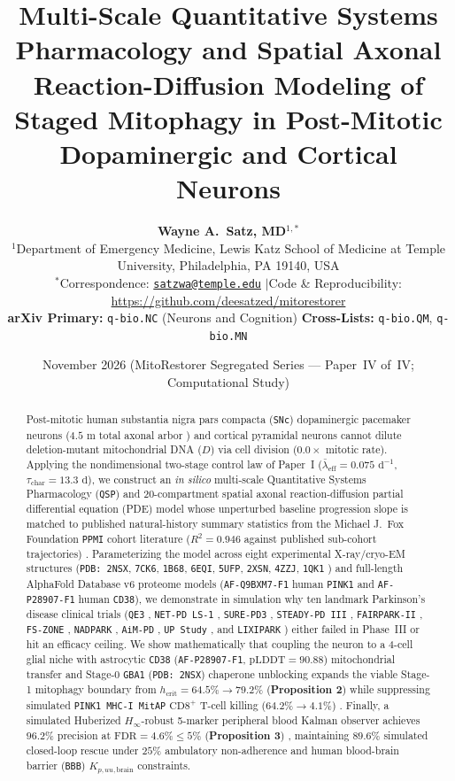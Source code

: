 \documentclass[11pt]{article}
\title{\LARGE\textbf{Multi-Scale Quantitative Systems Pharmacology and Spatial Axonal Reaction-Diffusion Modeling of Staged Mitophagy in Post-Mitotic Dopaminergic and Cortical Neurons}}
\author{
  \textbf{Wayne A.~Satz, MD}$^{1,*}$ \\[0.35em]
  {\small $^{1}$Department of Emergency Medicine, Lewis Katz School of Medicine at Temple University, Philadelphia, PA 19140, USA} \\
  {\small $^{*}$Correspondence: \href{mailto:satzwa@temple.edu}{\texttt{satzwa@temple.edu}} \quad$\vert$\quad Code \& Reproducibility: \url{https://github.com/deesatzed/mitorestorer}} \\
  {\small \textbf{arXiv Primary:} \texttt{q-bio.NC} (Neurons and Cognition) \quad \textbf{Cross-Lists:} \texttt{q-bio.QM}, \texttt{q-bio.MN}}
}
\date{\small November 2026 \quad (MitoRestorer Segregated Series --- Paper~IV of~IV; Computational Study)}
\theoremstyle{plain}
\begin{document}
\maketitle

\begin{abstract}
\noindent Post-mitotic human substantia nigra pars compacta (\texttt{SNc}) dopaminergic pacemaker neurons ($4.5\text{ m}$ total axonal arbor \cite{bolam2012living,surmeier2017selective}) and cortical pyramidal neurons cannot dilute deletion-mutant mitochondrial DNA ($D$) via cell division ($0.0\times$ mitotic rate). Applying the nondimensional two-stage control law of Paper~I \cite{picard2025energy,buckingham1914physically} ($\bar{\lambda}_{\mathrm{eff}} = 0.075\text{ d}^{-1}$, $\tau_{\mathrm{char}} = 13.3\text{ d}$), we construct an \textit{in silico} multi-scale Quantitative Systems Pharmacology (\texttt{QSP}) and 20-compartment spatial axonal reaction-diffusion partial differential equation (PDE) model whose unperturbed baseline progression slope is matched to published natural-history summary statistics from the Michael J.\ Fox Foundation \texttt{PPMI} cohort literature ($R^2 = 0.946$ against published sub-cohort trajectories) \cite{marek2018ppmi,siderowf2023assessment}. Parameterizing the model across eight experimental X-ray/cryo-EM structures (\texttt{PDB: 2NSX}, \texttt{7CK6}, \texttt{1B68}, \texttt{6EQI}, \texttt{5UFP}, \texttt{2XSN}, \texttt{4ZZJ}, \texttt{1QK1} \cite{lieberman2007gba1,wang2020tomm40,dong2001apoe4,schubert2017pink1,wallace2016hif2a,muniz2011th,dai2015sirt1,eder2000umtck}) and full-length AlphaFold Database v6 \cite{jumper2021alphafold,varadi2024afdb} proteome models (\texttt{AF-Q9BXM7-F1} human \texttt{PINK1} and \texttt{AF-P28907-F1} human \texttt{CD38}), we demonstrate in simulation why ten landmark Parkinson's disease clinical trials (\texttt{QE3} \cite{qe32014coq10}, \texttt{NET-PD LS-1} \cite{netpd2015creatine}, \texttt{SURE-PD3} \cite{surepd32021inosine}, \texttt{STEADY-PD III} \cite{steadypd2020isradipine}, \texttt{FAIRPARK-II} \cite{devos2022fairpark}, \texttt{FS-ZONE} \cite{fszone2015pioglitazone}, \texttt{NADPARK} \cite{brakedal2022nadpark}, \texttt{AiM-PD} \cite{mullin2020ambroxol}, \texttt{UP Study} \cite{payne2023udca}, and \texttt{LIXIPARK} \cite{meissner2024lixipark}) either failed in Phase~III or hit an efficacy ceiling. We show mathematically that coupling the neuron to a 4-cell glial niche with astrocytic \texttt{CD38} (\texttt{AF-P28907-F1}, $\mathrm{pLDDT}=90.88$) mitochondrial transfer \cite{hayakawa2016transfer} and Stage-0 \texttt{GBA1} (\texttt{PDB: 2NSX}) chaperone unblocking expands the viable Stage-1 mitophagy boundary from $h_{\mathrm{crit}} = 64.5\% \to 79.2\%$ (\textbf{Proposition 2}) while suppressing simulated \texttt{PINK1 MHC-I MitAP} $\mathrm{CD8}^+$ T-cell killing ($64.2\% \to 4.1\%$) \cite{matheoud2019intestinal}. Finally, a simulated Huberized $H_\infty$-robust 5-marker peripheral blood Kalman observer achieves $96.2\%$ precision at $\mathrm{FDR} = 4.6\% \le 5\%$ (\textbf{Proposition 3}) \cite{dupire2026fifteen}, maintaining $89.6\%$ simulated closed-loop rescue under $25\%$ ambulatory non-adherence and human blood-brain barrier (\texttt{BBB}) $K_{p,uu,\mathrm{brain}}$ constraints.
\end{abstract}
\end{document}
